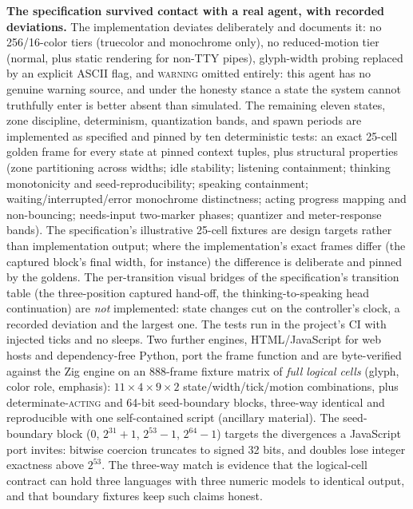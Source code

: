\documentclass[11pt]{article}
\newcommand{\railstate}[1]{\textsc{#1}}
\begin{document}
\textbf{The specification survived contact with a real agent, with
recorded deviations.} The implementation deviates deliberately and
documents it: no 256/16-color tiers (truecolor and monochrome only), no
reduced-motion tier (normal, plus static rendering for non-TTY pipes),
glyph-width probing replaced by an explicit ASCII flag, and
\railstate{warning} omitted entirely: this agent has no genuine warning source, and under the honesty stance a state the system cannot truthfully
enter is better absent than simulated. The remaining eleven states, zone discipline, determinism,
quantization bands, and spawn periods are implemented as specified and
pinned by ten deterministic tests: an exact 25-cell golden frame for
every state at pinned context tuples, plus structural properties (zone
partitioning across widths; idle stability; listening containment;
thinking monotonicity and seed-reproducibility; speaking containment;
waiting/interrupted/error monochrome distinctness; acting progress
mapping and non-bouncing; needs-input two-marker phases; quantizer and
meter-response bands). The specification's illustrative 25-cell fixtures
are design targets rather than implementation output; where the
implementation's exact frames differ (the captured block's final width,
for instance) the difference is deliberate and pinned by the goldens.
The per-transition visual bridges of the specification's transition table (the three-position captured hand-off, the thinking-to-speaking head continuation) are \emph{not} implemented: state changes cut on the controller's clock, a recorded deviation and the largest one. The tests run in the project's CI with injected ticks and no
sleeps. Two further engines, HTML/JavaScript for web hosts and dependency-free Python, port the frame function and are
byte-verified against the Zig engine on an 888-frame fixture matrix of
\emph{full logical cells} (glyph, color role, emphasis): $11 \times 4
\times 9 \times 2$ state/width/tick/motion combinations, plus
determinate-\railstate{acting} and 64-bit seed-boundary blocks,
three-way identical and reproducible with one self-contained script
(ancillary material). The seed-boundary block ($0$, $2^{31}{+}1$,
$2^{53}{-}1$, $2^{64}{-}1$) targets the divergences a JavaScript port
invites: bitwise coercion truncates to signed 32 bits, and doubles lose
integer exactness above $2^{53}$. The three-way match is evidence that
the logical-cell contract can hold three languages with three numeric
models to identical output, and that boundary fixtures keep such claims
honest.
\end{document}
